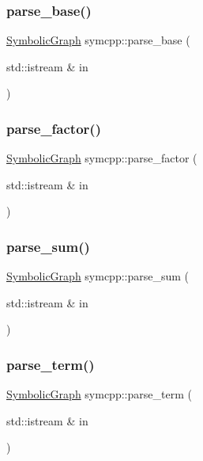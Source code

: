 \mbox{\label{namespacesymcpp_ac1190508010160ccc9081fd72ec62813}} 
\subsubsection{\texorpdfstring{parse\_base()}{parse\_base()}}
{\footnotesize\ttfamily \mbox{\hyperlink{classsymcpp_1_1SymbolicGraph}{Symbolic\+Graph}} symcpp\+::parse\+\_\+base (\begin{DoxyParamCaption}\item[{std\+::istream \&}]{in }\end{DoxyParamCaption})}

\mbox{\label{namespacesymcpp_aa72aeab474894e16fb524965bd1a2d82}} 
\subsubsection{\texorpdfstring{parse\_factor()}{parse\_factor()}}
{\footnotesize\ttfamily \mbox{\hyperlink{classsymcpp_1_1SymbolicGraph}{Symbolic\+Graph}} symcpp\+::parse\+\_\+factor (\begin{DoxyParamCaption}\item[{std\+::istream \&}]{in }\end{DoxyParamCaption})}

\mbox{\label{namespacesymcpp_a8fbf78e8fe2706165843d5716ff9025f}} 
\subsubsection{\texorpdfstring{parse\_sum()}{parse\_sum()}}
{\footnotesize\ttfamily \mbox{\hyperlink{classsymcpp_1_1SymbolicGraph}{Symbolic\+Graph}} symcpp\+::parse\+\_\+sum (\begin{DoxyParamCaption}\item[{std\+::istream \&}]{in }\end{DoxyParamCaption})}

\mbox{\label{namespacesymcpp_ab5470ea5b8d3a87476a1cbda0c3251d5}} 
\subsubsection{\texorpdfstring{parse\_term()}{parse\_term()}}
{\footnotesize\ttfamily \mbox{\hyperlink{classsymcpp_1_1SymbolicGraph}{Symbolic\+Graph}} symcpp\+::parse\+\_\+term (\begin{DoxyParamCaption}\item[{std\+::istream \&}]{in }\end{DoxyParamCaption})}

